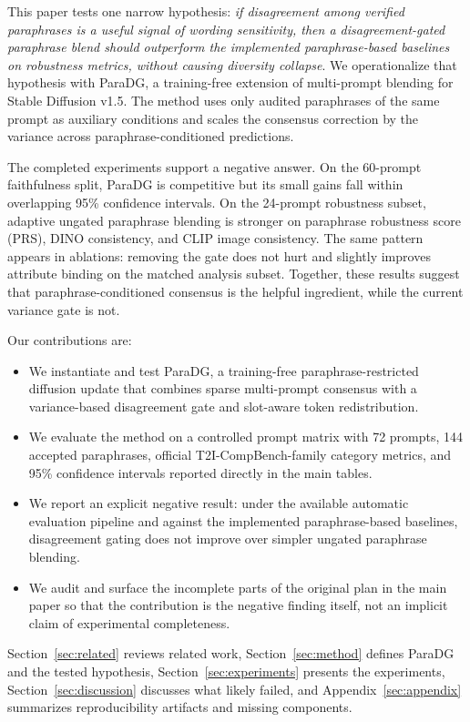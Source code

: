 \documentclass{article}
\newcommand{\method}{ParaDG}
\begin{document}
This paper tests one narrow hypothesis: \emph{if disagreement among verified paraphrases is a useful signal of wording sensitivity, then a disagreement-gated paraphrase blend should outperform the implemented paraphrase-based baselines on robustness metrics, without causing diversity collapse}. We operationalize that hypothesis with \method{}, a training-free extension of multi-prompt blending for Stable Diffusion v1.5. The method uses only audited paraphrases of the same prompt as auxiliary conditions and scales the consensus correction by the variance across paraphrase-conditioned predictions.

The completed experiments support a negative answer. On the 60-prompt faithfulness split, \method{} is competitive but its small gains fall within overlapping 95\% confidence intervals. On the 24-prompt robustness subset, adaptive ungated paraphrase blending is stronger on paraphrase robustness score (PRS), DINO consistency, and CLIP image consistency. The same pattern appears in ablations: removing the gate does not hurt and slightly improves attribute binding on the matched analysis subset. Together, these results suggest that paraphrase-conditioned consensus is the helpful ingredient, while the current variance gate is not.

Our contributions are:
\begin{itemize}
  \item We instantiate and test \method{}, a training-free paraphrase-restricted diffusion update that combines sparse multi-prompt consensus with a variance-based disagreement gate and slot-aware token redistribution.
  \item We evaluate the method on a controlled prompt matrix with 72 prompts, 144 accepted paraphrases, official T2I-CompBench-family category metrics, and 95\% confidence intervals reported directly in the main tables.
  \item We report an explicit negative result: under the available automatic evaluation pipeline and against the implemented paraphrase-based baselines, disagreement gating does not improve over simpler ungated paraphrase blending.
  \item We audit and surface the incomplete parts of the original plan in the main paper so that the contribution is the negative finding itself, not an implicit claim of experimental completeness.
\end{itemize}

Section~\ref{sec:related} reviews related work, Section~\ref{sec:method} defines \method{} and the tested hypothesis, Section~\ref{sec:experiments} presents the experiments, Section~\ref{sec:discussion} discusses what likely failed, and Appendix~\ref{sec:appendix} summarizes reproducibility artifacts and missing components.
\end{document}
